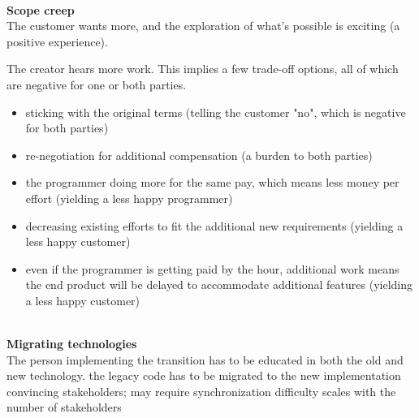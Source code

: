\ \\

\textbf{Scope creep} \\
The customer wants more, and the exploration of what's possible is exciting (a positive experience).

The creator hears more work. This implies a few trade-off options, all of which are negative for one or both parties.
\begin{itemize}
    \item sticking with the original terms (telling the customer "no", which is negative for both parties)
    \item re-negotiation for additional compensation (a burden to both parties)
    \item the programmer doing more for the same pay, which means less money per effort (yielding a less happy programmer)
    \item decreasing existing efforts to fit the additional new requirements (yielding a less happy customer)
    \item even if the programmer is getting paid by the hour, additional work means the end product will be delayed to accommodate additional features (yielding a less happy customer)
\end{itemize}

\ \\

\textbf{Migrating technologies} \\
The person implementing the transition has to be educated in both the old and new technology. 
the legacy code has to be migrated to the new implementation
convincing stakeholders; may require synchronization
difficulty scales with the number of stakeholders 
